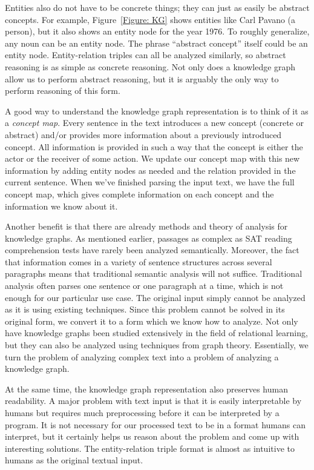 \documentclass[pageno]{jpaper}
\begin{document}
Entities also do not have to be concrete things; they can just as easily be
abstract concepts. For example, Figure~\ref{Figure: KG} shows entities like Carl
Pavano (a person), but it also shows an entity node for the year 1976. To
roughly generalize, any noun can be an entity node. The phrase ``abstract
concept'' itself could be an entity node. Entity-relation triples can all be
analyzed similarly, so abstract reasoning is as simple as concrete reasoning.
Not only does a knowledge graph allow us to perform abstract reasoning, but it
is arguably the only way to perform reasoning of this form.

A good way to understand the knowledge graph representation is to think of it as
a \textit{concept map}. Every sentence in the text introduces a new concept
(concrete or abstract) and/or provides more information about a previously
introduced concept. All information is provided in such a way that the concept
is either the actor or the receiver of some action. We update our concept map
with this new information by adding entity nodes as needed and the relation
provided in the current sentence. When we've finished parsing the input text,
we have the full concept map, which gives complete information on each concept
and the information we know about it.

Another benefit is that there are already methods and theory of analysis for
knowledge graphs. As mentioned earlier, passages as complex as SAT reading
comprehension tests have rarely been analyzed semantically. Moreover, the fact
that information comes in a variety of sentence structures across several
paragraphs means that traditional semantic analysis will not suffice.
Traditional analysis often parses one sentence or one paragraph at a time, which
is not enough for our particular use case. The original input simply cannot be
analyzed as it is using existing techniques. Since this problem cannot be solved
in its original form, we convert it to a form which we know how to analyze. Not
only have knowledge graphs been studied extensively in the field of relational
learning, but they can also be analyzed using techniques from graph theory.
Essentially, we turn the problem of analyzing complex text into a problem of
analyzing a knowledge graph.

At the same time, the knowledge graph representation also preserves human
readability. A major problem with text input is that it is easily interpretable
by humans but requires much preprocessing before it can be interpreted by a
program. It is not necessary for our processed text to be in a format humans can
interpret, but it certainly helps us reason about the problem and come up with
interesting solutions. The entity-relation triple format is almost as intuitive
to humans as the original textual input.
\end{document}
